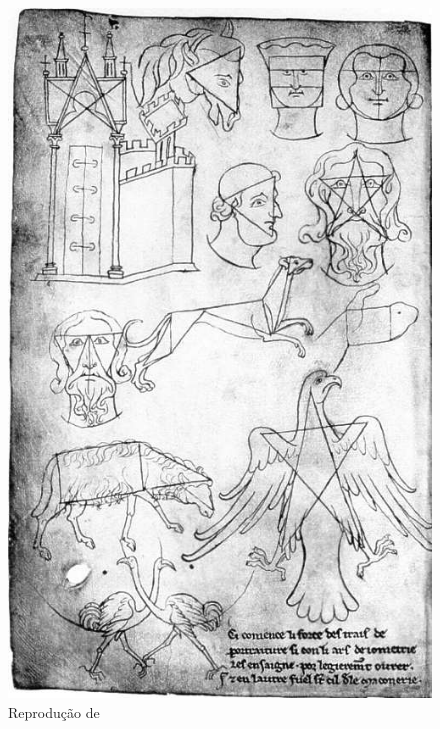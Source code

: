 \documentclass{article}
\begin{document}
\begin{figure}
  \centering\includegraphics[height=0.6\textheight,keepaspectratio]{images/villard-geometria-1.jpg}
  \caption{Reprodução de \citeauthor{villard-geometria-1}}
  \label{fig:villard-geometria-1}
\end{figure}
\end{document}
